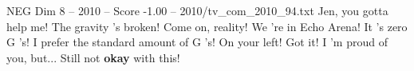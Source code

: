 \begin{textsample}{NEG Dim 8 – 2010 – Score -1.00 – 2010/tv\_com\_2010\_94.txt}  \label{ex:f8_neg_049}
Jen, you gotta help me!
The gravity 's broken!
Come on, reality!
We 're in Echo Arena!
It 's zero G 's!
I prefer the standard amount of G 's!
On your left!
Got it!
I 'm proud of you, but...
Still not \textbf{okay} with this!

\end{textsample}
